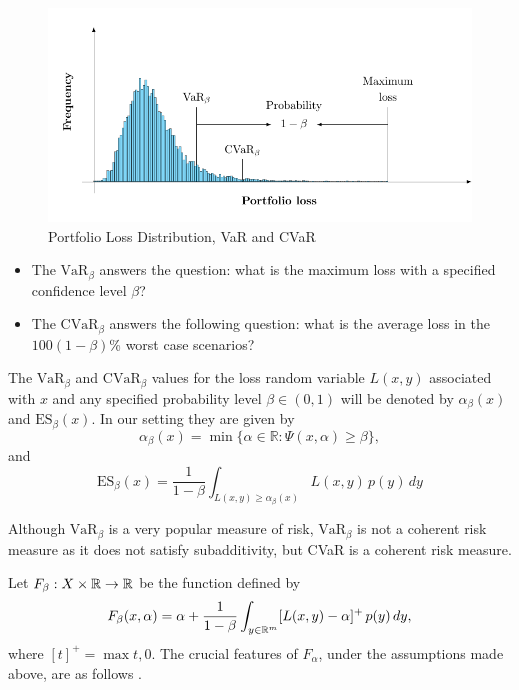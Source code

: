 \begin{figure}[H]
	\centering
	\includegraphics{figures/VarCvar.pdf}
	\caption{Portfolio Loss Distribution, VaR and CVaR}
	\label{fig:VarCvar}
\end{figure}

\begin{remark}\normalfont \hspace{1cm}
	\begin{itemize}
		\item The $\mbox{VaR}_\beta$ answers the question: what is the maximum loss with a specified confidence level $\beta$?
		\item The $\mbox{CVaR}_\beta$ answers the following question: what is the average loss in the $100(1-\beta)$\% worst case scenarios?
	\end{itemize}
\end{remark}

The $\mbox{VaR}_\beta$ and $\mbox{CVaR}_\beta$ values for the loss random variable $L(x,y)$ associated with $x$ and any specified probability level $\beta \in (0,1)$ will be denoted by $\alpha_\beta(x)$ and $\mbox{ES}_\beta(x)$. In our setting they are given by
\begin{equation}\label{eq:var}
	\alpha_\beta(x) = \min\{\alpha\in\mathbb{R} : \Psi(x,\alpha)\geq \beta \},
\end{equation}
and
\begin{equation}\label{eq:cvar}
	\mbox{ES}_\beta(x) = \frac{1}{1-\beta}\int_{L(x,y)\geq \alpha_\beta(x)} L(x,y)\, p(y)\,dy
\end{equation}

Although $\mbox{VaR}_\beta$ is a very popular measure of risk, $\mbox{VaR}_\beta$ is not a coherent risk measure as it does not satisfy subadditivity, but CVaR is a coherent risk measure.

Let $F_\beta:X\times \mathbb{R} \to \mathbb{R}$ be the function defined by
\[
	F_\beta(x,\alpha) = \alpha +\frac{1}{1-\beta}\int_{y\in\mathbb{R}^m}[L(x,y)-\alpha]^+ \, p(y)\, dy,
\]
where $[t]^+ = \max{t,0}$. The crucial features of $F_\alpha$, under the assumptions made above, are as
follows \cite[Theorem 2]{RockafellarUryasev2001}.

